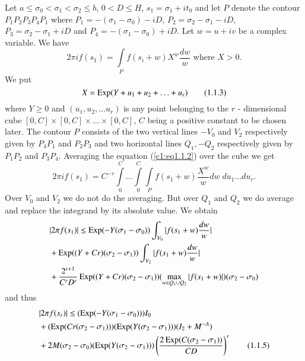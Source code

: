 Let $a \leq \sigma_0 < \sigma_1 < \sigma_2 \leq b$, $0 < D \leq H$, $s_1 = \sigma_1 + it_0$ and let $P$ denote the contour $P_1 P_2 P_3 P_4 P_1$ where $P_1 = - (\sigma_1-\sigma_0) - i D$, $P_2 = \sigma_2 - \sigma_1 - iD$, $P_3 = \sigma_2 - \sigma_1 + iD$ and $P_4 = - (\sigma_1 - \sigma_0) + iD$. Let $w = u+iv $ be a complex variable. We have 
\begin{equation*}
2 \pi i f(s_1) = \int\limits_P f(s_i+w) X^{w} \frac{dw}{w} \text{ where } X >0.
\tag{1.1.2}\label{c1:eq1.1.2}
\end{equation*}
We put 
\begin{equation*}
X = \operatorname{Exp} (Y + u_1 + u_2 + \ldots + u_r)\tag{1.1.3}\label{c1:eq1.1.3}
\end{equation*}
where $Y \geq 0$ and $(u_1, u_2, \ldots u_r)$ is any point belonging
to the $r$ - dimensional cube $[0,C] \times [0,C] \times \ldots \times [0,C]$, $C$ being a positive constant to be chosen later. The contour $P$ consists of the two vertical lines $-V_0$ and $V_2$ respectively given by $P_4P_1$ and $P_2 P_3$ and two horizontal lines $Q_1, - Q_2$ respectively given by $P_1P_2$ and $P_3P_4$. Averaging the equation (\ref{c1:eq1.1.2}) over the cube we get
\begin{equation*}
  2 \pi i f(s_1) = C^{-r} \int\limits^C_0 \ldots \int\limits^C_0 \int\limits_P f(s_1+w) \frac{X^w}{w} dw \; du_1 \ldots du_r. \tag{1.1.4}\label{c1:eq1.1.4}
\end{equation*}
Over $V_0$ and $V_2$ we do not do the averaging.  But over $Q_1$ and $Q_2$ we do average and replace the integrand by its absolute value. We obtain
\begin{align*}
& |2 \pi f (s_1)| \leq \operatorname{Exp} (-Y (\sigma_1 - \sigma_0)) \int_{V_0} |f(s_1 + w) \frac{dw}{w}| \\
& + \operatorname{Exp} ((Y + Cr) (\sigma_2 - \sigma_1)) \int_{V_2} |f(s_1+w) \frac{dw}{w}|\\
& + \frac{2^{r+1}}{C^r D^r} \operatorname{Exp} ((Y + Cr) (\sigma_2 - \sigma_1)) (\max\limits_{w \in Q_1 \cup Q_2} |f (s_1 + w)|) (\sigma_2 - \sigma_0)
\end{align*}
and thus\pageoriginale
\begin{align*}
& |2 \pi f(s_r)| \leq (\operatorname{Exp} (-Y (\sigma_1 - \sigma_0))) I_0 \\
& + (\operatorname{Exp} (Cr (\sigma_2 - \sigma_1))) (\operatorname{Exp} (Y (\sigma_2 -\sigma_1))) (I_2 + M^{-A})\\
& + 2M (\sigma_2 - \sigma_0) (\operatorname{Exp} (Y (\sigma_2 - \sigma_1))) \left( \frac{2 \operatorname{Exp} (C (\sigma_2 - \sigma_1))}{CD}\right)^r\tag{1.1.5}\label{c1:eq1.1.5}
\end{align*}
